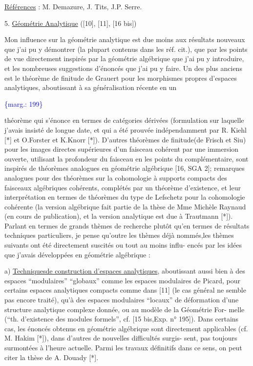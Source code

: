 \documentclass[11pt]{article}
\newcommand{\scanpage}[1]{\par\bigskip\noindent{\small\sffamily[scan #1]}\par}
\newcommand{\mspage}[1]{{\small\sffamily[p.\,#1]}}
\newcommand{\margin}[1]{\textcolor{blue}{\{\textsf{marg.:} #1\}}}
\newcommand{\uline}[1]{\underline{#1}}
\begin{document}
\uline{Références} : M. Demazure, J. Tits, J.P. Serre.

5. \uline{Géométrie Analytique} ([10], [11], [16 bis])

Mon influence sur la géométrie analytique est due moins aux résultats
nouveaux que j'ai pu y démontrer (la plupart contenus dans les réf. cit.), que
par les points de vue directement inspirés par la géométrie algébrique que j'ai
pu y introduire, et les nombreuses suggestions d'énoncés que j'ai pu y faire.
Un des plus anciens est le théorème de finitude de Grauert pour les morphismes
propres d'espaces analytiques, aboutissant à sa généralisation récente en un

\margin{199}

\clearpage
\scanpage{119/200}
\mspage{- 5 -}

théorème qui s'énonce en termes de catégories dérivées (formulation sur laquelle
j'avais insisté de longue date, et qui a été prouvée indépendamment par R. Kiehl
[*] et O.Forster et K.Knorr [*]). D'autres théorèmes de finitude(de Frisch et Siu)
pour les images directes supérieures d'un faisceau cohérent par une immersion
ouverte, utilisant la profondeur du faisceau en les points du complémentaire,
sont inspirés de théorèmes analogues en géométrie algébrique [16, SGA 2];
remarques analogues pour des théorèmes sur la cohomologie à supports compacts
des faisceaux algébriques cohérents, complétés par un théorème d'existence,
et leur interprétation en termes de théorèmes du type de Lefschetz pour la
cohomologie cohérente (la version algébrique fait partie de la thèse de Mme
Michèle Raynaud (en cours de publication), et la version analytique est due
à Trautmann [*]). Parlant en termes de grands thèmes de recherche plutôt qu'en
termes de résultats techniques particuliers, je pense qu'outre les thèmes déjà
nommés,les thèmes suivants ont été directement suscités ou tout au moins influ-%
encés par les idées que j'avais développées en géométrie algébrique :

a) \uline{Techniquesde construction d'espaces analytiques}, aboutissant aussi bien à
des espaces ``modulaires'' ``globaux'' comme les espaces modulaires de Picard,
pour certains espaces analytiques compacts comme dans [11] (le cas général ne
semble pas encore traité), qu'à des espaces modulaires ``locaux'' de déformation
d'une structure analytique complexe donnée, ou au modèle de la Géométrie For-%
melle (``th. d'existence des modules formels'', cf. [15 bis,Exp. n° 195]).
Dans certains cas, les énoncés obtenus en géométrie algébrique sont directement
applicables (cf. M. Hakim [*]), dans d'autres de nouvelles difficultés surgis-%
sent, pas toujours surmontées à l'heure actuelle. Parmi les travaux définitifs
dans ce sens, on peut citer la thèse de A. Douady [*].
\end{document}
